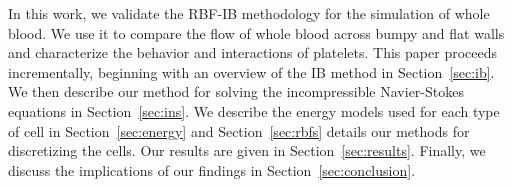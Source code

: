 In this work, we validate the RBF-IB methodology for the simulation of whole blood. We
use it to compare the flow of whole blood across bumpy and flat walls and characterize
the behavior and interactions of platelets. This paper proceeds incrementally, beginning
with an overview of the IB method in Section~\ref{sec:ib}. We then describe our method
for solving the incompressible Navier-Stokes equations in Section~\ref{sec:ins}. We
describe the energy models used for each type of cell in Section~\ref{sec:energy} and
Section~\ref{sec:rbfs} details our methods for discretizing the cells. Our results are
given in Section~\ref{sec:results}.  Finally, we discuss the implications of our findings
in Section~\ref{sec:conclusion}.

